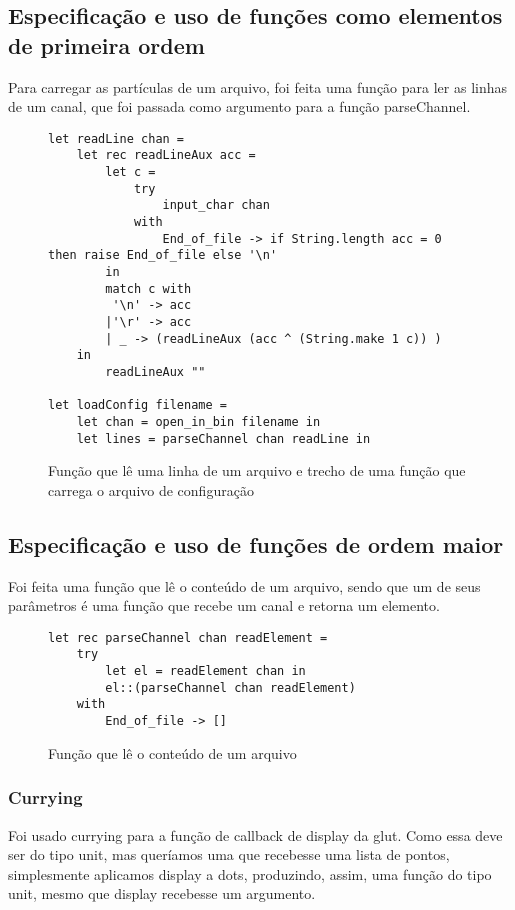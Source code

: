 \documentclass[a4paper,10pt]{article}
\begin{document}
\subsection{Especificação e uso de funções como elementos de primeira ordem}
	
	Para carregar as partículas de um arquivo, foi feita uma função para ler as linhas de um canal, que foi passada como argumento para a função parseChannel.
	
	\begin{figure}[H]
	\centering	
	\begin{lstlisting}
let readLine chan =
	let rec readLineAux acc =
		let c =
			try
				input_char chan
			with
				End_of_file -> if String.length acc = 0 then raise End_of_file else '\n'
		in
		match c with
		 '\n' -> acc
		|'\r' -> acc
		| _ -> (readLineAux (acc ^ (String.make 1 c)) )
	in
		readLineAux ""
		
let loadConfig filename =
	let chan = open_in_bin filename in
	let lines = parseChannel chan readLine in
	\end{lstlisting}
	\caption{Função que lê uma linha de um arquivo e trecho de uma função que carrega o arquivo de configuração}
\end{figure}
	
\subsection{Especificação e uso de funções de ordem maior}

Foi feita uma função que lê o conteúdo de um arquivo, sendo que um de seus parâmetros é uma função que recebe um canal e retorna um elemento.

\begin{figure}[H]
	\centering	
	\begin{lstlisting}
let rec parseChannel chan readElement =
	try
		let el = readElement chan in
		el::(parseChannel chan readElement)
	with
		End_of_file -> []
	\end{lstlisting}
	\caption{Função que lê o conteúdo de um arquivo}
\end{figure}
	
\subsubsection{Currying}
	
	Foi usado currying para a função de callback de display da glut. Como essa deve ser do tipo unit, mas queríamos uma que recebesse uma lista de pontos, simplesmente aplicamos display a dots, produzindo, assim, uma função do tipo unit, mesmo que display recebesse um argumento.
	
\end{document}
